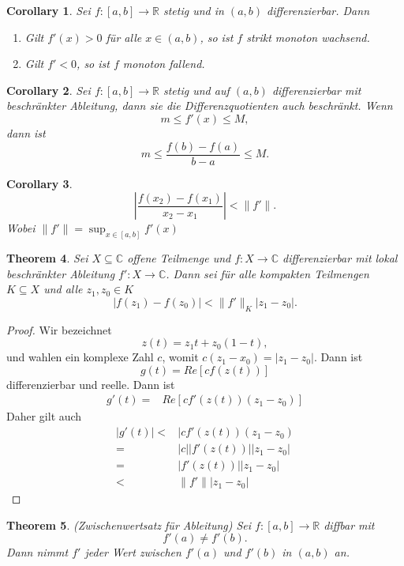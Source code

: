 \documentclass[prb,12pt]{revtex4-2}
\newtheorem{Theorem}{Theorem}
\newtheorem{Corollary}[Theorem]{Corollary}
\theoremstyle{definition}
\theoremstyle{definition}
\newcommand{\R}{\mathbb{R}}
\newcommand{\C}{\mathbb{C}}
\begin{document}
\begin{Corollary}
	Sei $f:[a,b]\to \R$ stetig und in $(a,b)$ differenzierbar. Dann

	\begin{enumerate}[label=(\roman*)]
		\item Gilt $f'\left(x \right) >0$ f\"{u}r alle $x\in (a,b)$, so ist $f$ strikt monoton wachsend.
		\item Gilt $f'<0$, so ist $f$ monoton fallend.
	\end{enumerate}
\end{Corollary}

\begin{Corollary}
	Sei $f:[a,b]\to \R$ stetig und auf $(a,b)$ differenzierbar mit beschr\"{a}nkter Ableitung, dann sie die Differenzquotienten auch beschr\"{a}nkt. Wenn
	\[
	m\le f'(x) \le M
	,\] 
	dann ist
	\[
	m\le \frac{f(b)-f(a)}{b-a}\le M
	.\] 
\end{Corollary}

\begin{Corollary}
	\[
	\left| \frac{f(x_2)-f(x_1)}{x_2-x_1} \right| <\|f'\|
	.\] 
	Wobei $\|f'\|=\sup_{x\in [a,b]}f'(x)$
\end{Corollary}

\begin{Theorem}
	Sei $X\subseteq \C$ offene Teilmenge und $f:X\to \C$ differenzierbar mit lokal beschr\"{a}nkter Ableitung $f':X\to \C$. Dann sei f\"{u}r alle kompakten Teilmengen $K\subseteq X$ und alle $z_1,z_0\in K$ 
	\[
	|f(z_1)-f(z_0)|<\|f'\|_K|z_1-z_0|
	.\] 
\end{Theorem}

\begin{proof}
	Wir bezeichnet
	\[
	z(t)=z_1t+z_0(1-t)
	,\] 
	und wahlen ein komplexe Zahl $c$, womit $c(z_1-x_0)=|z_1-z_0|$. Dann ist
	\[g(t)=Re\left[ cf(z(t)) \right] 
	\] 
	differenzierbar und reelle. Dann ist
	\begin{align*}
		g'(t)=&Re\left[ cf'(z(t))(z_1-z_0) \right]
	\end{align*}
	Daher gilt auch
	\begin{align*}
		|g'(t)|<& |cf'(z(t))(z_1-z_0)\\
		=& |c| |f'(z(t))| |z_1-z_0|\\
		=& |f'(z(t))| |z_1-z_0|\\
		<& \|f'\| |z_1-z_0|
	\end{align*}
\end{proof}

\begin{Theorem}
	(Zwischenwertsatz f\"{u}r Ableitung) Sei $f:[a,b]\to \R$ diffbar mit
	\[
	f'(a)\neq f'(b)
	.\] 
	Dann nimmt $f'$ jeder Wert zwischen $f'(a)$ und $f'(b)$ in $(a,b)$ an.
\end{Theorem}
\end{document}
